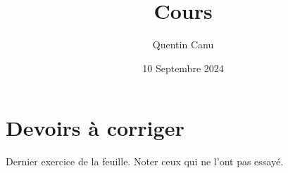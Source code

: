 \documentclass{article}
\title{Cours}
\date{10 Septembre 2024}
\author{Quentin Canu}
\begin{document}
\maketitle

\section{Devoirs à corriger}
Dernier exercice de la feuille. Noter ceux qui ne l'ont pas essayé.
\end{document}
